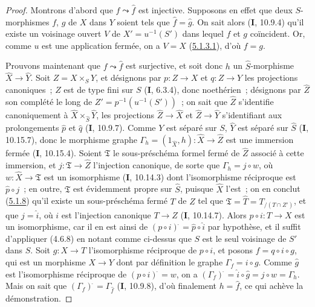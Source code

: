 \begin{proof}
Montrons d'abord que $f\leadsto\widehat f$ est injective. Supposons en effet que deux
$S$-morphismes $f$, $g$ de $X$ dans $Y$ soient tels que $\widehat f=\widehat g$.
On sait alors (\textbf{I}, 10.9.4) qu'il existe un voisinage ouvert $V$ de
$X'=u^{-1}(S')$ dans lequel $f$ et $g$ coïncident. Or, comme $u$ est une application
fermée, on a $V=X$ (\hyperref[III.5.1.3.1-fr]{5.1.3.1}), d'où $f=g$.

Prouvons maintenant que $f\leadsto\widehat f$ est surjective, et soit donc $h$ un
$\widehat S$-morphisme $\widehat X\to\widehat Y$. Soit $Z=X\times_S Y$, et
désignons par $p:Z\to X$ et $q:Z\to Y$ les projections canoniques~; $Z$ est de
type fini sur $S$ (\textbf{I}, 6.3.4), donc noethérien~; désignons par $\widehat Z$ son
complété le long de $Z'=p^{-1}(u^{-1}(S'))$~; on sait que $\widehat Z$ s'identifie
canoniquement à $\widehat X\times_{\widehat S}\widehat Y$, les projections
$\widehat Z\to\widehat X$ et $\widehat Z\to\widehat Y$ s'identifiant aux
prolongements $\widehat p$ et $\widehat q$ (\textbf{I}, 10.9.7). Comme $Y$ est séparé sur
$S$, $\widehat Y$ est séparé sur $\widehat S$ (\textbf{I}, 10.15.7), donc le morphisme
graphe
$\Gamma_h=(1_{\widehat X},h):\widehat X\to\widehat Z$
est une immersion fermée (\textbf{I}, 10.15.4). Soient $\mathfrak T$ le sous-préschéma
formel fermé de $\widehat Z$ associé à cette immersion, et
$j:\mathfrak T\to\widehat Z$ l'injection canonique, de sorte que
$\Gamma_h=j\circ w$, où $w:\widehat X\to\mathfrak T$ est un isomorphisme
(\textbf{I}, 10.14.3) dont l'isomorphisme réciproque est $\widehat p\circ j$~; en outre,
$\mathfrak T$ est évidemment propre sur $\widehat S$, puisque $\widehat X$ l'est~;
on en conclut (\hyperref[III.5.1.8-fr]{5.1.8}) qu'il existe un sous-préschéma
fermé $T$ de $Z$ tel que
$\mathfrak T=\widehat T=T_{/(T\cap Z')}$, et que $j=\widehat i$, où $i$ est
l'injection canonique $T\to Z$ (\textbf{I}, 10.14.7). Alors $p\circ i:T\to X$ est un
isomorphisme, car il en est ainsi de
$(p\circ i)^{\widehat{\,}}=\widehat p\circ\widehat i$ par hypothèse, et il suffit
d'appliquer
(4.6.8) en notant comme ci-dessus que $S$ est le seul voisinage de $S'$ dans $S$.
Soit $g:X\to T$ l'isomorphisme réciproque de $p\circ i$, et posons
$f=q\circ i\circ g$, qui est un morphisme $X\to Y$ dont par définition le graphe
$\Gamma_f=i\circ g$. Comme $\widehat g$ est l'isomorphisme réciproque de
$(p\circ i)^{\widehat{\,}}=w$, on a
$(\Gamma_f)^{\widehat{\,}}=\widehat i\circ\widehat g=j\circ w=\Gamma_h$.
Mais on sait que $(\Gamma_f)^{\widehat{\,}}=\Gamma_{\widehat f}$ (\textbf{I}, 10.9.8), d'où
finalement $h=\widehat f$, ce qui achève la démonstration.
\end{proof}

